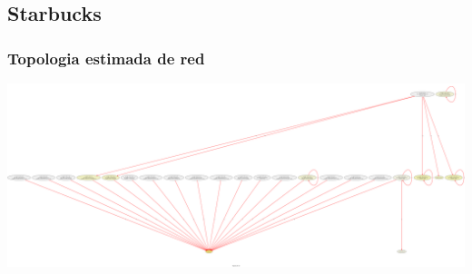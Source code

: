 \subsection{Starbucks}
\subsubsection{Topologia estimada de red}
\includegraphics[scale=0.22]{../experimentacion-svilerino/starbucks/full-experiment-1/graph.png}

